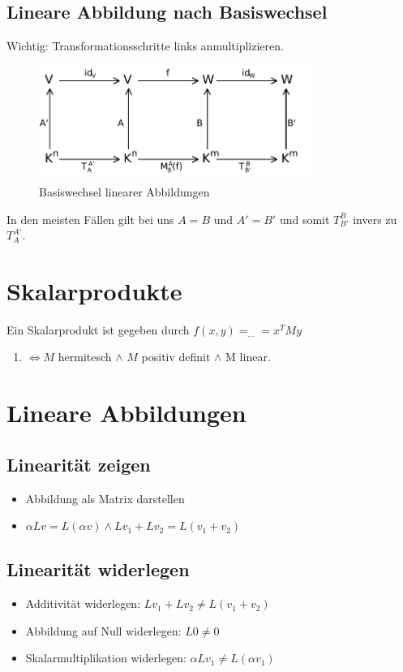 \subsection{Lineare Abbildung nach Basiswechsel}

Wichtig: Transformationsschritte links anmultiplizieren.

\begin{figure}[H]
    \centering
    \includegraphics[width=0.8\textwidth]{Change_of_basis2.pdf}
    \caption{Basiswechsel linearer Abbildungen}
\end{figure}

In den meisten Fällen gilt bei uns $A=B$ und $ A'=B'$ und somit $T_{B'}^{B}$ invers zu $T_A^{A'}$. 

\section{Skalarprodukte}
Ein Skalarprodukt ist gegeben durch $f(x,y)= _{\dots} =x^T My$
\begin{enumerate}
    \item $\iff M$ hermitesch $\wedge$ $M$ positiv definit $\wedge$ M linear.
\end{enumerate}

\section{Lineare Abbildungen}
\subsection{Linearität zeigen}
\begin{itemize}
    \item Abbildung als Matrix darstellen
    \item $\alpha Lv = L(\alpha v) \wedge Lv_1 + Lv_2 = L(v_1+v_2)$
\end{itemize}

\subsection{Linearität widerlegen}
\begin{itemize}
    \item Additivität widerlegen: $Lv_1 + Lv_2 \neq L(v_1+v_2)$
    \item Abbildung auf Null widerlegen: $L0 \neq 0$
    \item Skalarmultiplikation widerlegen: $\alpha L v_1 \neq L(\alpha v_1)$
\end{itemize}


